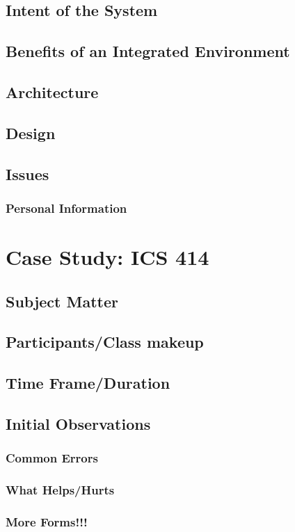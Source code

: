 \section{Intent of the System}
\section{Benefits of an Integrated Environment}
\section{Architecture}
\section{Design}
\section{Issues}
\subsection{Personal Information}

\chapter{Case Study: ICS 414}
\section{Subject Matter}
\section{Participants/Class makeup}
\section{Time Frame/Duration}
\section{Initial Observations}
\subsection{Common Errors}
\subsection{What Helps/Hurts}
\subsection{More Forms!!!}
